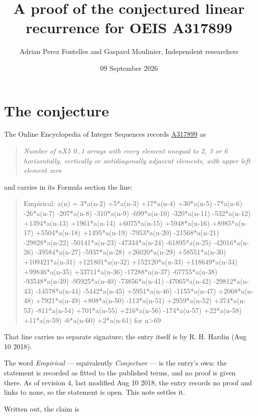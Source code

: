 \documentclass[11pt]{article}
\title{A proof of the conjectured linear recurrence for OEIS A317899}
\author{Adrian Perez Fontelles and Gaspard Moulinier, Independent researchers}
\date{09 September 2026}
\theoremstyle{definition}
\begin{document}
\maketitle
\section{The conjecture}

The Online Encyclopedia of Integer Sequences records \href{https://oeis.org/A317899}{A317899} as

\begin{quote}\itshape Number of nX5 0..1 arrays with every element unequal to 2, 3 or 6 horizontally, vertically or antidiagonally adjacent elements, with upper left element zero\end{quote}

and carries in its Formula section the line:

\begin{quote}\ttfamily Empirical: a(n) = 3*a(n-2) +5*a(n-3) +17*a(n-4) +30*a(n-5) -7*a(n-6) -26*a(n-7) -207*a(n-8) -310*a(n-9) -699*a(n-10) -320*a(n-11) -532*a(n-12) +1394*a(n-13) +1961*a(n-14) +6075*a(n-15) +5948*a(n-16) +8985*a(n-17) +5504*a(n-18) +1495*a(n-19) -7953*a(n-20) -21568*a(n-21) -29828*a(n-22) -50141*a(n-23) -47334*a(n-24) -61895*a(n-25) -42016*a(n-26) -39584*a(n-27) -5937*a(n-28) +26020*a(n-29) +58551*a(n-30) +109421*a(n-31) +121801*a(n-32) +152120*a(n-33) +118649*a(n-34) +99846*a(n-35) +33711*a(n-36) -17288*a(n-37) -67755*a(n-38) -93548*a(n-39) -95925*a(n-40) -73856*a(n-41) -47065*a(n-42) -29812*a(n-43) -14578*a(n-44) -5442*a(n-45) +5951*a(n-46) -1155*a(n-47) +2068*a(n-48) +7921*a(n-49) +808*a(n-50) -113*a(n-51) +2959*a(n-52) +374*a(n-53) -811*a(n-54) +701*a(n-55) +216*a(n-56) -174*a(n-57) +22*a(n-58) +11*a(n-59) -6*a(n-60) +2*a(n-61) for n>69\end{quote}

That line carries no separate signature; the entry itself is by R. H. Hardin (Aug 10 2018).

The word {\itshape Empirical} --- equivalently {\itshape Conjecture} --- is the entry's own: the statement is recorded as fitted to the published terms, and no proof is given there. As of revision 4, last modified Aug 10 2018, the entry records no proof and links to none, so the statement is open. This note settles it.

Written out, the claim is
\end{document}
